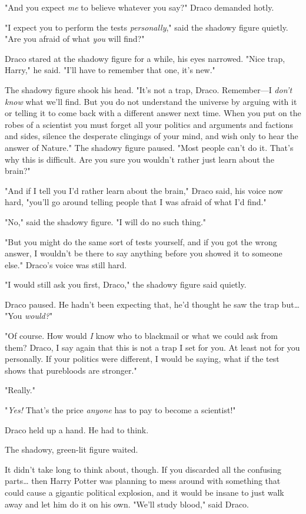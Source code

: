 "And you expect \emph{me} to believe whatever you say?" Draco demanded hotly.

"I expect you to perform the tests \emph{personally}," said the shadowy figure 
quietly. "Are you afraid of what \emph{you} will find?"

Draco stared at the shadowy figure for a while, his eyes narrowed. "Nice trap, 
Harry," he said. "I'll have to remember that one, it's new."

The shadowy figure shook his head. "It's not a trap, Draco. Remember---I 
\emph{don't know} what we'll find. But you do not understand the universe by 
arguing with it or telling it to come back with a different answer next time. 
When you put on the robes of a scientist you must forget all your politics and 
arguments and factions and sides, silence the desperate clingings of your mind, 
and wish only to hear the answer of Nature." The shadowy figure paused. "Most 
people can't do it. That's why this is difficult. Are you sure you wouldn't 
rather just learn about the brain?"

"And if I tell you I'd rather learn about the brain," Draco said, his voice now 
hard, "you'll go around telling people that I was afraid of what I'd find."

"No," said the shadowy figure. "I will do no such thing."

"But you might do the same sort of tests yourself, and if you got the wrong 
answer, I wouldn't be there to say anything before you showed it to someone 
else." Draco's voice was still hard.

"I would still ask you first, Draco," the shadowy figure said quietly.

Draco paused. He hadn't been expecting that, he'd thought he saw the trap 
but{\ldots} "You \emph{would?}"

"Of course. How would \emph{I} know who to blackmail or what we could ask from 
them? Draco, I say again that this is not a trap I set for you. At least not 
for you personally. If your politics were different, I would be saying, what if 
the test shows that purebloods are stronger."

"Really."

"\emph{Yes!} That's the price \emph{anyone} has to pay to become a scientist!"

Draco held up a hand. He had to think.

The shadowy, green-lit figure waited.

It didn't take long to think about, though. If you discarded all the confusing 
parts{\ldots} then Harry Potter was planning to mess around with something that 
could cause a gigantic political explosion, and it would be insane to just walk 
away and let him do it on his own. "We'll study blood," said Draco.

